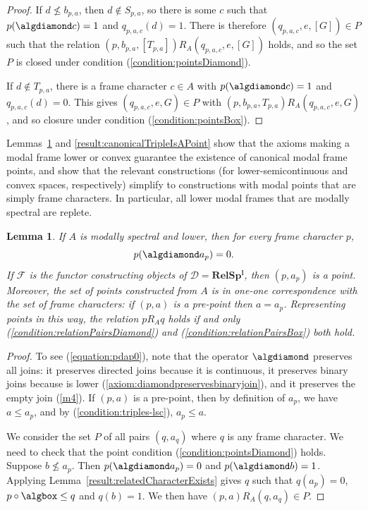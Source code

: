 \documentclass{article}[a4paper]
\newtheorem{lemma}{Lemma}%
\theoremstyle{definition}
\newcommand{\Dcal}{\mathcal{D}} %
\newcommand{\Fcal}{\mathcal{F}} %
\newcommand{\relspl}{\mathbf{RelSp^l}}
\begin{document}
\begin{proof}
If $d\nleq b_{p,a}$, then $d \notin S_{p,a}$, so there is some $c$ such that $p(\algdiamond c)=1$  and $q_{p,a,c}(d)=1$. There is therefore $(q_{p,a,c},e,[G]) \in P$ such that the relation $(p, b_{p,a}, [T_{p,a}] ) R_A (q_{p,a,c},e,[G])$ holds, and so the set $P$ is closed under condition (\ref{condition:pointsDiamond}). 

If $d \notin T_{p,a}$, there is a frame character $c\in A$ with $p(\algdiamond c)=1$ and $q_{p,a,c}(d)=0$. This gives $(q_{p,a,c},e,G) \in P$ with $(p, b_{p,a}, T_{p,a} ) R_A (q_{p,a,c},e,G)$, and so closure under condition (\ref{condition:pointsBox}).
\end{proof}

Lemmas~\ref{result:relsplPoints} and \ref{result:canonicalTripleIsAPoint} show that the axioms making a modal frame lower or convex guarantee the existence of canonical modal frame points, and show that the relevant constructions (for lower-semicontinuous and convex spaces, respectively) simplify to constructions with modal points that are simply frame characters. In particular, all lower modal frames that are modally spectral are replete. 

\begin{lemma}
\label{result:relsplPoints}
    If $A$ is modally spectral and lower, then for every frame character $p$, 
    \begin{equation*}
        \label{equation:pdap0}
        p(\algdiamond a_p) = 0 .
    \end{equation*}
    If $\Fcal$ is the functor constructing objects of $\Dcal = \relspl$, then 
    $(p,a_p)$ is a point. Moreover, the set of points constructed from $A$ is in one-one correspondence with the set of frame characters: if $(p,a)$ is a pre-point then $a=a_p$. Representing points in this way, the relation $p R_A q$ holds if and only  (\ref{condition:relationPairsDiamond}) 
and 
(\ref{condition:relationPairsBox}) 
both hold.  
\end{lemma}

\begin{proof}
To see (\ref{equation:pdap0}), note that the operator $\algdiamond$ preserves all joins: it preserves directed joins because it is continuous, it preserves binary joins because is lower (\ref{axiom:diamondpreservesbinaryjoin}), and it preserves the empty join (\ref{m4}). If $(p,a)$ is a pre-point, then by definition of $a_p$, we have $a \leq a_p$, and by (\ref{condition:triples-lsc}), $a_p \leq a$.

We consider the set $P$ of all pairs $(q,a_q)$ where $q$ is any frame character. 
We need to check that the point condition (\ref{condition:pointsDiamond}) holds. Suppose $b \nleq a_p$. Then $p(\algdiamond a_p) = 0$ and $p (\algdiamond b) = 1$. Applying Lemma~\ref{result:relatedCharacterExists} gives $q$ such that $q(a_p) = 0$, $p \circ \algbox \leq q$ and $q(b)=1$. We then have $(p,a) R_A (q,a_q) \in P$. 

\end{proof}
\end{document}

